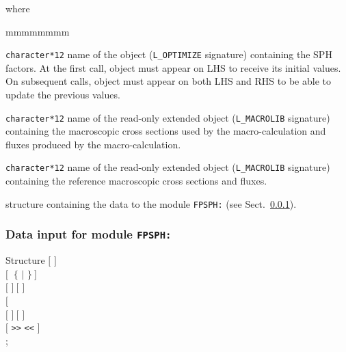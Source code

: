 \noindent where

\begin{ListeDeDescription}{mmmmmmmm}

\item[\dusa{OPTIM}] \texttt{character*12} name of the  object ({\tt L\_OPTIMIZE} signature) containing the
SPH factors. At the first call, object  must appear on LHS to receive its initial values. On subsequent calls, object
 must appear on both LHS and RHS to be able to update the previous values.

\item[\dusa{MACROLIB}] \texttt{character*12} name of the read-only extended  object ({\tt L\_MACROLIB} signature) containing the
macroscopic cross sections used by the macro-calculation and fluxes produced by the macro-calculation.

\item[\dusa{MACROREF}] \texttt{character*12} name of the read-only extended  object ({\tt L\_MACROLIB} signature) containing the
reference macroscopic cross sections and fluxes.

\item[\dstr{fpsph\_data}] structure containing the data to the module \texttt{FPSPH:} (see Sect.~\ref{sect:lnsr_data}).

\end{ListeDeDescription}
\vskip 0.2cm

\subsubsection{Data input for module \texttt{FPSPH:}}\label{sect:lnsr_data}

\begin{DataStructure}{Structure }
$[$   $]$ \\
$[~$ $\{$  $|$  $\}~]$ \\
$[$   $]~[$   $]$\\
$[$   \\
$[$   $]~[$   $]$ \\
$[$  {\tt >>}  {\tt <<} $]$ \\
;
\end{DataStructure}

